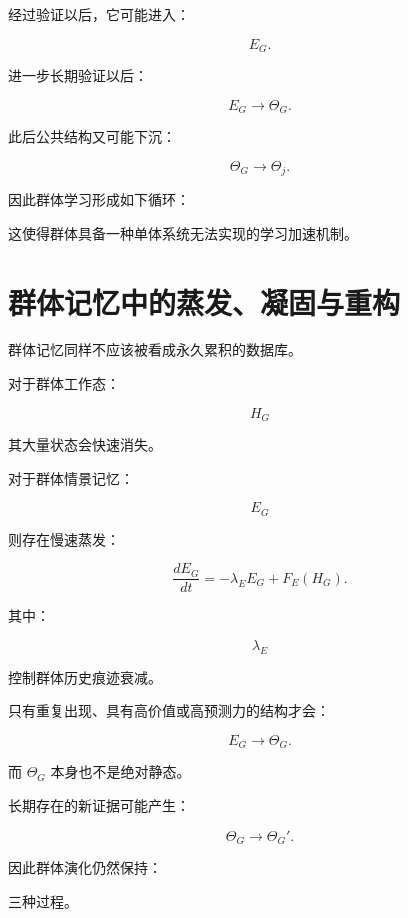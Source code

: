 经过验证以后，它可能进入：

\[
E_G.
\]

进一步长期验证以后：

\[
E_G
\rightarrow
\Theta_G.
\]

此后公共结构又可能下沉：

\[
\Theta_G
\rightarrow
\Theta_j.
\]

因此群体学习形成如下循环：

\begin{statementbox}
\centering
{}
\end{statementbox}

这使得群体具备一种单体系统无法实现的学习加速机制。


\section{群体记忆中的蒸发、凝固与重构}

群体记忆同样不应该被看成永久累积的数据库。

对于群体工作态：

\[
H_G
\]

其大量状态会快速消失。

对于群体情景记忆：

\[
E_G
\]

则存在慢速蒸发：

\[
\frac{dE_G}{dt}
=
-\lambda_EE_G
+
F_E(H_G).
\]

其中：

\[
\lambda_E
\]

控制群体历史痕迹衰减。

只有重复出现、具有高价值或高预测力的结构才会：

\[
E_G
\rightarrow
\Theta_G.
\]

而 $\Theta_G$ 本身也不是绝对静态。

长期存在的新证据可能产生：

\[
\Theta_G
\rightarrow
\Theta_G'.
\]

因此群体演化仍然保持：

\begin{statementbox}
\centering
{}
\end{statementbox}

三种过程。


